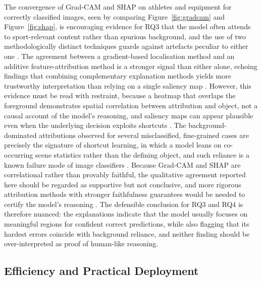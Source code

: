 The convergence of Grad-CAM and SHAP on athletes and equipment for correctly classified images, seen by comparing Figure~\ref{fig:gradcam} and Figure~\ref{fig:shap}, is encouraging evidence for RQ3 that the model often attends to sport-relevant content rather than spurious background, and the use of two methodologically distinct techniques guards against artefacts peculiar to either one \citep{selvaraju2017gradcam,lundberg2017shap}.
The agreement between a gradient-based localisation method and an additive feature-attribution method is a stronger signal than either alone, echoing findings that combining complementary explanation methods yields more trustworthy interpretation than relying on a single saliency map \citep{tempel2024shapgradcam}.
However, this evidence must be read with restraint, because a heatmap that overlaps the foreground demonstrates spatial correlation between attribution and object, not a causal account of the model's reasoning, and saliency maps can appear plausible even when the underlying decision exploits shortcuts \citep{kares2025saliency,nguyen2025xaicv}.
The background-dominated attributions observed for several misclassified, fine-grained cases are precisely the signature of shortcut learning, in which a model leans on co-occurring scene statistics rather than the defining object, and such reliance is a known failure mode of image classifiers \citep{geirhos2020shortcut}.
Because Grad-CAM and SHAP are correlational rather than provably faithful, the qualitative agreement reported here should be regarded as supportive but not conclusive, and more rigorous attribution methods with stronger faithfulness guarantees would be needed to certify the model's reasoning \citep{bassi2024lrp}.
The defensible conclusion for RQ3 and RQ4 is therefore nuanced: the explanations indicate that the model usually focuses on meaningful regions for confident correct predictions, while also flagging that its hardest errors coincide with background reliance, and neither finding should be over-interpreted as proof of human-like reasoning.

\subsection{Efficiency and Practical Deployment}
\label{subsec:disc-deploy}

